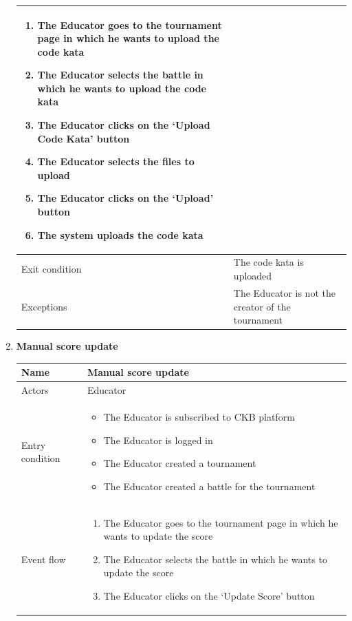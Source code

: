 \begin{enumerate}[label=UC\arabic*:]
\begin{tabular}{|p{3cm}|p{8cm}|}
        \begin{enumerate}[label=\arabic*.]
            \item The Educator goes to the tournament page in which he wants to upload the code kata
            \item The Educator selects the battle in which he wants to upload the code kata
            \item The Educator clicks on the `Upload Code Kata' button
            \item The Educator selects the files to upload
            \item The Educator clicks on the `Upload' button
            \item The system uploads the code kata
        \end{enumerate}
        \\
        \hline
        Exit condition & The code kata is uploaded \\
        \hline
        Exceptions & The Educator is not the creator of the tournament \\
        \hline
    \end{tabular}
    \item \textbf{Manual score update} \\
    \begin{tabular}{|p{3cm}|p{8cm}|}
        \hline
        Name & Manual score update \\
        \hline
        Actors & Educator \\
        \hline
        Entry condition &   
        \begin{itemize}
            \item The Educator is subscribed to CKB platform
            \item The Educator is logged in
            \item The Educator created a tournament
            \item The Educator created a battle for the tournament
        \end{itemize}
        \\
        \hline
        Event flow &
        \begin{enumerate}[label=\arabic*.]
            \item The Educator goes to the tournament page in which he wants to update the score
            \item The Educator selects the battle in which he wants to update the score
            \item The Educator clicks on the `Update Score' button

\end{enumerate}
\end{tabular}
\end{enumerate}

